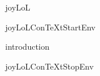 
\usemodule[t-diSimp]

\startDiSimpComponent joyLoL

\diSimpEnvironment joyLoLConTeXtStartEnv

\diSimpComponent introduction

\diSimpEnvironment joyLoLConTeXtStopEnv

\stopDiSimpComponent
